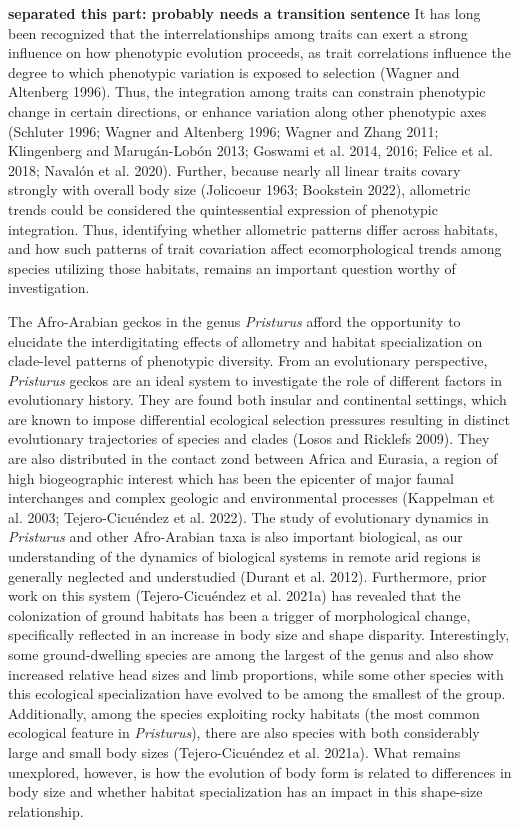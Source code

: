\documentclass[
  11pt,
]{article}
\begin{document}
\textbf{separated this part: probably needs a transition sentence} It
has long been recognized that the interrelationships among traits can
exert a strong influence on how phenotypic evolution proceeds, as trait
correlations influence the degree to which phenotypic variation is
exposed to selection (Wagner and Altenberg 1996). Thus, the integration
among traits can constrain phenotypic change in certain directions, or
enhance variation along other phenotypic axes (Schluter 1996; Wagner and
Altenberg 1996; Wagner and Zhang 2011; Klingenberg and Marugán-Lobón
2013; Goswami et al. 2014, 2016; Felice et al. 2018; Navalón et al.
2020). Further, because nearly all linear traits covary strongly with
overall body size (Jolicoeur 1963; Bookstein 2022), allometric trends
could be considered the quintessential expression of phenotypic
integration. Thus, identifying whether allometric patterns differ across
habitats, and how such patterns of trait covariation affect
ecomorphological trends among species utilizing those habitats, remains
an important question worthy of investigation. \hfill\break

The Afro-Arabian geckos in the genus \emph{Pristurus} afford the
opportunity to elucidate the interdigitating effects of allometry and
habitat specialization on clade-level patterns of phenotypic diversity.
From an evolutionary perspective, \emph{Pristurus} geckos are an ideal
system to investigate the role of different factors in evolutionary
history. They are found both insular and continental settings, which are
known to impose differential ecological selection pressures resulting in
distinct evolutionary trajectories of species and clades (Losos and
Ricklefs 2009). They are also distributed in the contact zond between
Africa and Eurasia, a region of high biogeographic interest which has
been the epicenter of major faunal interchanges and complex geologic and
environmental processes (Kappelman et al. 2003; Tejero-Cicuéndez et al.
2022). The study of evolutionary dynamics in \emph{Pristurus} and other
Afro-Arabian taxa is also important biological, as our understanding of
the dynamics of biological systems in remote arid regions is generally
neglected and understudied (Durant et al. 2012). Furthermore, prior work
on this system (Tejero-Cicuéndez et al. 2021a) has revealed that the
colonization of ground habitats has been a trigger of morphological
change, specifically reflected in an increase in body size and shape
disparity. Interestingly, some ground-dwelling species are among the
largest of the genus and also show increased relative head sizes and
limb proportions, while some other species with this ecological
specialization have evolved to be among the smallest of the group.
Additionally, among the species exploiting rocky habitats (the most
common ecological feature in \emph{Pristurus}), there are also species
with both considerably large and small body sizes (Tejero-Cicuéndez et
al. 2021a). What remains unexplored, however, is how the evolution of
body form is related to differences in body size and whether habitat
specialization has an impact in this shape-size relationship.
\hfill\break
\end{document}
